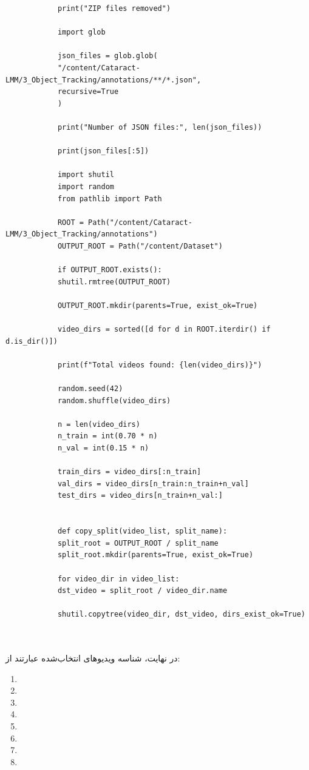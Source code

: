 \documentclass{article}
\begin{document}
\begin{latin}
\begin{LTR}
\begin{verbatim}
			print("ZIP files removed")
			
			import glob
			
			json_files = glob.glob(
			"/content/Cataract-LMM/3_Object_Tracking/annotations/**/*.json",
			recursive=True
			)
			
			print("Number of JSON files:", len(json_files))
			
			print(json_files[:5])
			
			import shutil
			import random
			from pathlib import Path
			
			ROOT = Path("/content/Cataract-LMM/3_Object_Tracking/annotations")
			OUTPUT_ROOT = Path("/content/Dataset")
			
			if OUTPUT_ROOT.exists():
			shutil.rmtree(OUTPUT_ROOT)
			
			OUTPUT_ROOT.mkdir(parents=True, exist_ok=True)
			
			video_dirs = sorted([d for d in ROOT.iterdir() if d.is_dir()])
			
			print(f"Total videos found: {len(video_dirs)}")
			
			random.seed(42)
			random.shuffle(video_dirs)
			
			n = len(video_dirs)
			n_train = int(0.70 * n)
			n_val = int(0.15 * n)
			
			train_dirs = video_dirs[:n_train]
			val_dirs = video_dirs[n_train:n_train+n_val]
			test_dirs = video_dirs[n_train+n_val:]
			
			
			def copy_split(video_list, split_name):
			split_root = OUTPUT_ROOT / split_name
			split_root.mkdir(parents=True, exist_ok=True)
			
			for video_dir in video_list:
			dst_video = split_root / video_dir.name
			
			shutil.copytree(video_dir, dst_video, dirs_exist_ok=True)
			
			
		\end{verbatim}
	\end{LTR}
\end{latin}

در نهایت، شناسه ویدیوهای انتخاب‌شده عبارتند از:

\begin{enumerate}[label=\arabic*.]
	\item {}
	\item {}
	\item {}
	\item {}
	\item {}
	\item {}
	\item {}
	\item {}
\end{enumerate}
\end{document}
